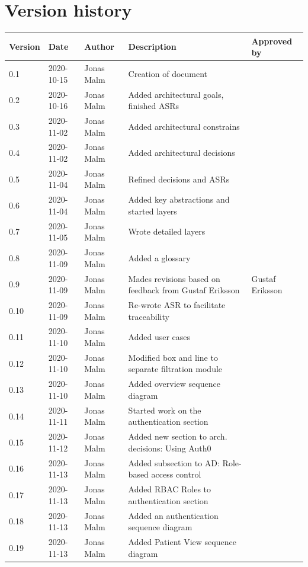 \documentclass{article}
\begin{document}
\begin{table}
\section*{Version history}
\centering
\begin{tabular}{|l|l|l|p{7cm}|p{3cm}|}
\hline
Version & Date & Author & Description & Approved by \\ \hline
0.1 & 2020-10-15 & Jonas Malm & Creation of document & \\ 
0.2 & 2020-10-16 & Jonas Malm & Added architectural goals, finished ASRs & \\
0.3 & 2020-11-02 & Jonas Malm & Added architectural constrains & \\ 
0.4 & 2020-11-02 & Jonas Malm & Added architectural decisions & \\
0.5 & 2020-11-04 & Jonas Malm & Refined decisions and ASRs & \\
0.6 & 2020-11-04 & Jonas Malm & Added key abstractions and started layers & \\
0.7 & 2020-11-05 & Jonas Malm & Wrote detailed layers & \\
0.8 & 2020-11-09 & Jonas Malm & Added a glossary & \\
0.9 & 2020-11-09 & Jonas Malm & Mades revisions based on feedback from Gustaf Eriksson & Gustaf Eriksson\\
0.10 & 2020-11-09 & Jonas Malm & Re-wrote ASR to facilitate traceability & \\
0.11 & 2020-11-10 & Jonas Malm & Added user cases & \\
0.12 & 2020-11-10 & Jonas Malm & Modified box and line to separate filtration module & \\
0.13 & 2020-11-10 & Jonas Malm & Added overview sequence diagram & \\
0.14 & 2020-11-11 & Jonas Malm & Started work on the authentication section & \\
0.15 & 2020-11-12 & Jonas Malm & Added new section to arch. decisions: Using Auth0 & \\
0.16 & 2020-11-13 & Jonas Malm & Added subsection to AD: Role-based access control & \\
0.17 & 2020-11-13 & Jonas Malm & Added RBAC Roles to authentication section & \\
0.18 & 2020-11-13 & Jonas Malm & Added an authentication sequence diagram & \\
0.19 & 2020-11-13 & Jonas Malm & Added Patient View sequence diagram & \\ \hline

\end{tabular}
\end{table}
\end{document}
